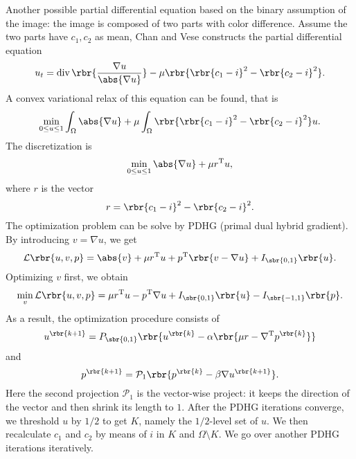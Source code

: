 \documentclass[english, nochinese]{pnote}
\DeclareMathOperator\opdiv{\mathrm{div}}
\begin{document}
Another possible partial differential equation based on the binary assumption of the image: the image is composed of two parts with color difference. Assume the two parts have $ c_1, c_2 $ as mean, Chan and Vese \parencite{goldstein_geometric_2010} constructs the partial differential equation
\begin{equation}
u_t = \opdiv \rbr{\frac{ \nabla u }{\abs{ \nabla u }}} - \mu \rbr{ \rbr{ c_1 - i }^2 - \rbr{ c_2 - i }^2 }.
\end{equation}
A convex variational relax of this equation can be found, that is
\begin{equation}
\min_{ 0 \le u \le 1 } \int_{\Omega} \abs{ \nabla u } + \mu \int_{\Omega} \rbr{ \rbr{ c_1 - i }^2 - \rbr{ c_2 - i }^2 } u.
\end{equation}
The discretization is
\begin{equation}
\min_{ 0 \le u \le 1 } \abs{ \nabla u } + \mu r^{\text{T}} u,
\end{equation}
where $r$ is the vector
\begin{equation}
r = \rbr{ c_1 - i }^2 - \rbr{ c_2 - i }^2.
\end{equation}
The optimization problem can be solve by PDHG (primal dual hybrid gradient). By introducing $ v = \nabla u $, we get
\begin{equation}
\mathcal{L} \rbr{ u, v, p } = \abs{v} + \mu r^{\text{T}} u + p^{\text{T}} \rbr{ v - \nabla u } + I_{\sbr{ 0, 1 }} \rbr{u}.
\end{equation}
Optimizing $v$ first, we obtain
\begin{equation}
\min_v \mathcal{L} \rbr{ u, v, p } = \mu r^{\text{T}} u - p^{\text{T}} \nabla u + I_{\sbr{ 0, 1 }} \rbr{u} - I_{\sbr{ -1, 1 }} \rbr{p}.
\end{equation}
As a result, the optimization procedure consists of
\begin{equation}
u^{\rbr{ k + 1 }} = P_{\sbr{ 0, 1 }} \rbr{ u^{\rbr{k}} - \alpha \rbr{ \mu r - \nabla^{\text{T}} p^{\rbr{k}} } }
\end{equation}
and
\begin{equation}
p^{\rbr{ k + 1 }} = \mathcal{P}_1 \rbr{ p^{\rbr{k}} - \beta \nabla u^{\rbr{ k + 1 }} }.
\end{equation}
Here the second projection $ \mathcal{P}_1 $ is the vector-wise project: it keeps the direction of the vector and then shrink its length to $1$. After the PDHG iterations converge, we threshold $u$ by $ 1 / 2 $ to get $K$, namely the $ 1 / 2 $-level set of $u$. We then recalculate $c_1$ and $c_2$ by means of $i$ in $K$ and $ \Omega \setminus K $. We go over another PDHG iterations iteratively.
\end{document}
